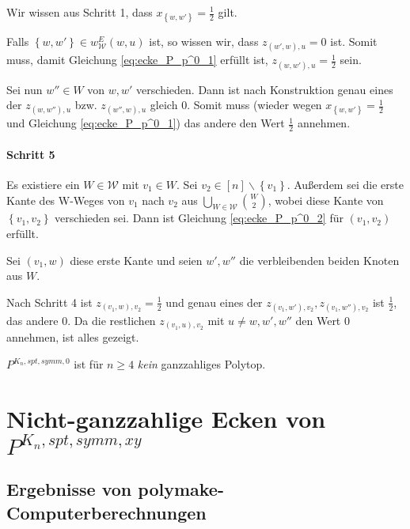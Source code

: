 \documentclass[10p,a4paper,BCOR = 12mm, DIV=15]{scrbook}
\begin{document}
\begin{bew}
Wir wissen aus Schritt 1, dass $x_{\left\{w, w'\right\}} = \frac{1}{2}$ gilt. 

Falls $\left\{w, w'\right\} \in w_{\mathcal{W}}^E\left(w, u\right)$ ist, so wissen wir, dass $z_{\left(w', w\right), u} = 0$ ist. Somit muss, damit Gleichung \eqref{eq:ecke_P_p^0_1} erfüllt ist, $z_{\left(w, w'\right), u} = \frac{1}{2}$ sein.

Sei nun $w'' \in W$ von $w, w'$ verschieden. Dann ist nach Konstruktion genau eines der $z_{\left(w, w''\right), u}$ bzw. $z_{\left(w'', w\right), u}$ gleich 0. Somit muss (wieder wegen $x_{\left\{w, w'\right\}} = \frac{1}{2}$ und Gleichung \eqref{eq:ecke_P_p^0_1}) das andere den Wert $\frac{1}{2}$ annehmen.

\paragraph{Schritt 5} Es existiere ein $W  \in \mathcal{W}$ mit $v_1 \in W$. Sei $v_2 \in \left[n\right] \backslash \left\{v_1\right\}$. Außerdem sei die erste Kante des W-Weges von $v_1$ nach $v_2$ aus $\bigcup_{W \in \mathcal{W}} {W \choose 2}$, wobei diese Kante von $\left\{v_1, v_2\right\}$ verschieden sei.
Dann ist Gleichung \eqref{eq:ecke_P_p^0_2} für $\left(v_1, v_2\right)$ erfüllt.

Sei $\left(v_1, w\right)$ diese erste Kante und seien $w', w''$ die verbleibenden beiden Knoten aus $W$.

Nach Schritt 4 ist $z_{\left(v_1, w\right), v_2} = \frac{1}{2}$ und genau eines der $z_{\left(v_1, w'\right), v_2}, z_{\left(v_1, w''\right), v_2}$ ist $\frac{1}{2}$, das andere $0$. Da die restlichen $z_{\left(v_1, u\right), v_2}$ mit $u \neq w, w', w''$ den Wert $0$ annehmen, ist alles gezeigt.
\end{bew}

\begin{Kor}
$P^{K_n, spt, symm, 0}$ ist für $n\geq 4$ \emph{kein} ganzzahliges Polytop.
\end{Kor}

\section{Nicht-ganzzahlige Ecken von $P^{K_n, spt, symm, xy}$}

\subsection{Ergebnisse von polymake-Computerberechnungen}
\end{document}
